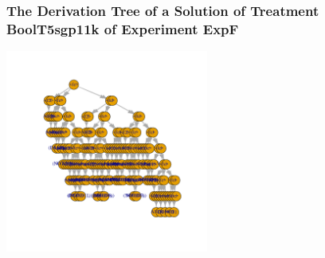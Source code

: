  \begin{frame}
 \frametitle{ The Derivation Tree of a Solution of Treatment BoolT5sgp11k of Experiment ExpF }
 \begin{center}
\includegraphics[width=0.5\textwidth, angle=0]
{ExpFDerivationTreeFigure009.pdf}
 \end{center}
 \label{report/ExpFDerivationTreeFigure009.pdf}  
 \end{frame}

